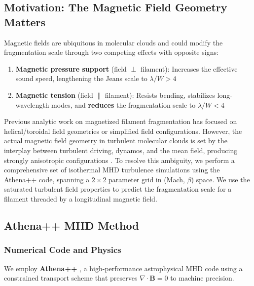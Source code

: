 \documentclass[11pt,a4paper]{article}
\begin{document}
\subsection{Motivation: The Magnetic Field Geometry Matters}

Magnetic fields are ubiquitous in molecular clouds and could modify the fragmentation scale through two competing effects with opposite signs:
\begin{enumerate}
    \item \textbf{Magnetic pressure support} (field $\perp$ filament): Increases the effective sound speed, lengthening the Jeans scale to $\lambda/W > 4$
    \item \textbf{Magnetic tension} (field $\parallel$ filament): Resists bending, stabilizes long-wavelength modes, and \textbf{reduces} the fragmentation scale to $\lambda/W < 4$
\end{enumerate}

Previous analytic work on magnetized filament fragmentation has focused on helical/toroidal field geometries \citep{Fiege2000, Hanawa2017} or simplified field configurations. However, the actual magnetic field geometry in turbulent molecular clouds is set by the interplay between turbulent driving, dynamos, and the mean field, producing strongly anisotropic configurations \citep{Federrath2016}. To resolve this ambiguity, we perform a comprehensive set of isothermal MHD turbulence simulations using the Athena++ code, spanning a $2\times2$ parameter grid in (Mach, $\beta$) space. We use the saturated turbulent field properties to predict the fragmentation scale for a filament threaded by a longitudinal magnetic field.

\subsection{Athena++ MHD Method}

\subsubsection{Numerical Code and Physics}

We employ \textbf{Athena++} \citep{Stone2020}, a high-performance astrophysical MHD code using a constrained transport scheme that preserves $\nabla \cdot \mathbf{B} = 0$ to machine precision.
\end{document}
